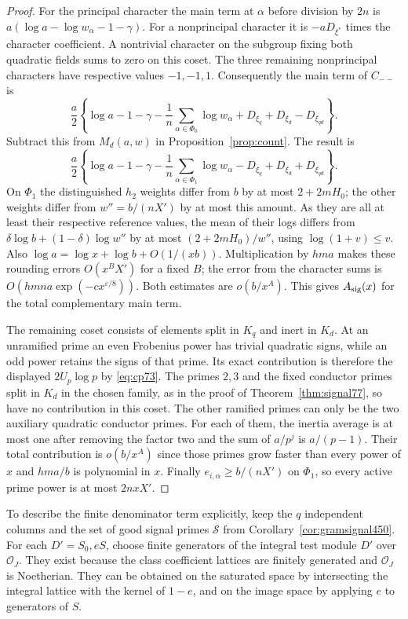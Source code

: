 \documentclass[a4paper,11pt]{article}
\theoremstyle{definition}
\theoremstyle{remark}
\numberwithin{equation}{section}
\begin{document}
\begin{proof}
For the principal character the main term at \(\alpha\) before
division by \(2n\) is \(a(\log a-\log w_\alpha-1-\gamma)\).
For a nonprincipal character it is \(-aD_{\xi^*}\) times the
character coefficient. A nontrivial character on the subgroup
fixing both quadratic fields sums to zero on this coset. The
three remaining nonprincipal characters have respective values
\(-1,-1,1\). Consequently the main term of \(C_{--}\) is
\[
 \frac a2\left\{\log a-1-\gamma-\frac1n
   \sum_{\alpha\in\Phi_0}\log w_\alpha+
   D_{\xi_q}+D_{\xi_d}-D_{\xi_{qd}}\right\}.
\]
Subtract this from \(M_d(a,w)\) in Proposition~\ref{prop:count}.
The result is
\[
 \frac a2\left\{\log a-1-\gamma-\frac1n
   \sum_{\alpha\in\Phi_1}\log w_\alpha-
   D_{\xi_q}+D_{\xi_d}+D_{\xi_{qd}}\right\}.
\]
On \(\Phi_1\) the distinguished \(h_2\) weights differ from \(b\)
by at most \(2+2mH_0\); the other weights differ from
\(w''=b/(nX')\) by at most this amount. As they are all at
least their respective reference values, the mean of their logs
differs from \(\delta\log b+(1-\delta)\log w''\) by at most
\((2+2mH_0)/w''\), using \(\log(1+v)\le v\).
Also \(\log a=\log x+\log b+O(1/(xb))\). Multiplication by
\(hma\) makes these rounding errors \(O(x^B X')\) for a fixed
\(B\); the error from the character sums is
\(O(hmna\exp(-c x^{\varepsilon/8}))\). Both estimates are
\(o(b/x^A)\). This gives \(A_{\rm sig}(x)\) for the total
complementary main term.

The remaining coset consists of elements split in \(K_q\) and
inert in \(K_d\). At an unramified prime an even Frobenius power
has trivial quadratic signs, while an odd power retains the
signs of that prime. Its exact contribution is therefore the
displayed \(2U_p\log p\) by \eqref{eq:cp73}. The primes \(2,3\)
and the fixed conductor primes split in \(K_d\) in the chosen
family, as in the proof of Theorem~\ref{thm:signal77}, so have
no contribution in this coset. The other ramified primes can
only be the two auxiliary quadratic conductor primes. For each
of them, the inertia average is at most one after removing the
factor two and the sum of \(a/p^j\) is \(a/(p-1)\).
Their total contribution is \(o(b/x^A)\) since those primes
grow faster than every power of \(x\) and \(hma/b\) is polynomial
in \(x\). Finally \(e_{i,\alpha}\ge b/(nX')\) on \(\Phi_1\),
so every active prime power is at most \(2nxX'\).
\end{proof}

To describe the finite denominator term explicitly, keep the
\(q\) independent columns and the set of good signal primes
\(\mathcal S\) from Corollary~\ref{cor:gramsignal450}.
For each \(D'=S_0,eS\), choose finite generators of the
integral test module \(D'\) over \(\mathcal O_J\). They exist
because the class coefficient lattices are finitely generated
and \(\mathcal O_J\) is Noetherian. They can be obtained on the
saturated space by intersecting the integral lattice with the
kernel of \(1-e\), and on the image space by applying \(e\)
to generators of \(S\).
\end{document}
